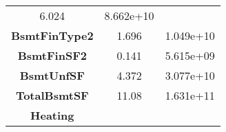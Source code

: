 \documentclass[]{article}
\begin{document}
\begin{longtable}[c]{@{}ccc@{}}
\begin{minipage}[t]{0.16\columnwidth}\centering\strut
6.024
\strut\end{minipage} &
\begin{minipage}[t]{0.19\columnwidth}\centering\strut
8.662e+10
\strut\end{minipage}\tabularnewline
\begin{minipage}[t]{0.25\columnwidth}\centering\strut
\textbf{BsmtFinType2}
\strut\end{minipage} &
\begin{minipage}[t]{0.16\columnwidth}\centering\strut
1.696
\strut\end{minipage} &
\begin{minipage}[t]{0.19\columnwidth}\centering\strut
1.049e+10
\strut\end{minipage}\tabularnewline
\begin{minipage}[t]{0.25\columnwidth}\centering\strut
\textbf{BsmtFinSF2}
\strut\end{minipage} &
\begin{minipage}[t]{0.16\columnwidth}\centering\strut
0.141
\strut\end{minipage} &
\begin{minipage}[t]{0.19\columnwidth}\centering\strut
5.615e+09
\strut\end{minipage}\tabularnewline
\begin{minipage}[t]{0.25\columnwidth}\centering\strut
\textbf{BsmtUnfSF}
\strut\end{minipage} &
\begin{minipage}[t]{0.16\columnwidth}\centering\strut
4.372
\strut\end{minipage} &
\begin{minipage}[t]{0.19\columnwidth}\centering\strut
3.077e+10
\strut\end{minipage}\tabularnewline
\begin{minipage}[t]{0.25\columnwidth}\centering\strut
\textbf{TotalBsmtSF}
\strut\end{minipage} &
\begin{minipage}[t]{0.16\columnwidth}\centering\strut
11.08
\strut\end{minipage} &
\begin{minipage}[t]{0.19\columnwidth}\centering\strut
1.631e+11
\strut\end{minipage}\tabularnewline
\begin{minipage}[t]{0.25\columnwidth}\centering\strut
\textbf{Heating}
\strut\end{minipage} &
\begin{minipage}[t]{0.16\columnwidth}\centering\strut

\end{minipage}
\end{longtable}
\end{document}
